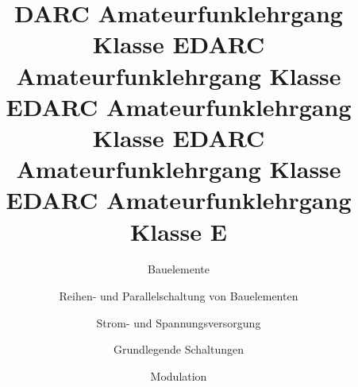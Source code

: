 \documentclass[aspectratio = 169]{beamer}
\begin{document}
\title{DARC Amateurfunklehrgang Klasse E}
\author{Bauelemente}
\begin{frame}
\maketitle
\end{frame}






\title{DARC Amateurfunklehrgang Klasse E}
\author{Reihen- und Parallelschaltung von Bauelementen}
\begin{frame}
\maketitle
\end{frame}





\title{DARC Amateurfunklehrgang Klasse E}
\author{Strom- und Spannungsversorgung}
\begin{frame}
\maketitle
\end{frame}





\title{DARC Amateurfunklehrgang Klasse E}
\author{Grundlegende Schaltungen}
\begin{frame}
\maketitle
\end{frame}







\title{DARC Amateurfunklehrgang Klasse E}
\author{Modulation}
\begin{frame}
\maketitle
\end{frame}





\end{document}
